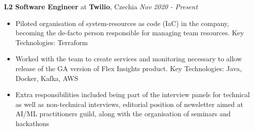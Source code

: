 
{\textbf{L2 Software Engineer} at \textbf{Twilio}, Czechia} 
    \hfill {\em Nov 2020 - Present}
    \begin{itemize}
        \item Piloted organisation of system-resources as code (IaC) in the company, becoming the de-facto person responsible for managing team resources. Key Technologies: Terraform
        \item Worked with the team to create services and monitoring necessary to allow release of the GA version of Flex Insights product. Key Technologies: Java, Docker, Kafka, AWS
        \item Extra responsibilities included being part of the interview panels for technical as well as non-technical interviews, editorial position of newsletter aimed at AI/ML practitioners guild, along with the organisation of seminars and hackathons
    \end{itemize}
